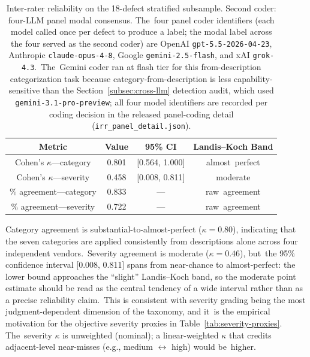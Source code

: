 \documentclass[software,article,accept,pdftex,oneauthor]{Definitions/mdpi}
\begin{document}
\begin{table}[H]
\caption{Inter-rater reliability on the 18-defect stratified subsample. Second coder: four-LLM panel modal consensus. The~four panel coder identifiers (each model called once per defect to produce a label; the modal label across the four served as the second coder) are OpenAI \texttt{gpt-5.5-2026-04-23}, Anthropic \texttt{claude-opus-4-8}, Google \texttt{gemini-2.5-flash}, and xAI \texttt{grok-4.3}.~The~Gemini coder ran at flash tier for this from-description categorization task because category-from-description is less capability-sensitive than the Section~\ref{subsec:cross-llm} detection audit, which used \texttt{gemini-3.1-pro-preview}; all four model identifiers are recorded per coding decision in the released panel-coding detail (\texttt{irr\_panel\_detail.json}).}
\label{tab:irr}
\begin{tabularx}{\textwidth}{CccC}
\toprule
\textbf{Metric} & \textbf{Value} & \textbf{95\% CI} & \textbf{Landis--Koch Band} \\
\midrule
Cohen's $\kappa$---category   & 0.801 & [0.564, 1.000] & almost~perfect \\
Cohen's $\kappa$---severity   & 0.458 & [0.008, 0.811] & moderate \\
\% agreement---category       & 0.833 &---& raw~agreement \\
\% agreement---severity       & 0.722 & --- & raw~agreement \\
\bottomrule
\end{tabularx}
\end{table}





\vspace{-3pt}

Category agreement is substantial-to-almost-perfect ($\kappa = 0.80$), indicating that the seven categories are applied consistently from descriptions alone across four independent vendors.~Severity agreement is moderate ($\kappa = 0.46$), but~the 95\% confidence interval [0.008, 0.811] spans from near-chance to almost-perfect: the lower bound approaches the ``slight'' Landis--Koch band, so the moderate point estimate should be read as the central tendency of a wide interval rather than as a precise reliability claim.~This is consistent with severity grading being the most judgment-dependent dimension of the taxonomy, and it~is the empirical motivation for the objective severity proxies in Table~\ref{tab:severity-proxies}. The~severity $\kappa$ is unweighted (nominal); a linear-weighted $\kappa$ that credits adjacent-level near-misses (e.g., medium $\leftrightarrow$ high) would be~higher.
\end{document}
